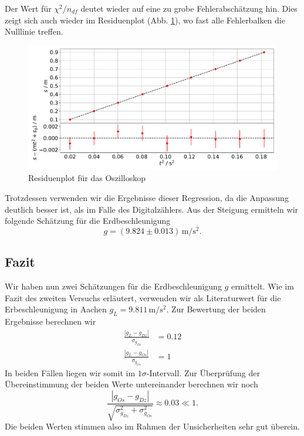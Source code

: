 \documentclass[a4paper, 12pt]{scrartcl}
\begin{document}
Der Wert für $\chi^2/n_{df}$ deutet wieder auf eine zu grobe Fehlerabschätzung hin. Dies zeigt sich auch wieder im Residuenplot (Abb. \ref{ResOz}), wo fast alle Fehlerbalken die Nulllinie treffen.
\begin{figure}[h!]
	\centering
	\includegraphics[width=\textwidth]{plots/regression_fF2.pdf}
	\caption{Residuenplot für das Oszilloskop}
	\label{ResOz}
\end{figure}
Trotzdessen verwenden wir die Ergebnisse dieser Regression, da die Anpassung deutlich besser ist, als im Falle des Digitalzählers. Aus der Steigung ermitteln wir folgende Schätzung für die Erdbeschleunigung
$$g = (9.824 \pm 0.013) \, \mathrm m / \mathrm s^2 .$$


\subsection{Fazit}

Wir haben nun zwei Schätzungen für die Erdbeschleunigung $g$ ermittelt. Wie im Fazit des zweiten Versuchs erläutert, verwenden wir als Literaturwert für die Erbeschleunigung in Aachen $g_L = 9.811 \, \mathrm m / \mathrm s^2$. 
Zur Bewertung der beiden Ergebnisse berechnen wir
\begin{align*}
\frac{|g_L-g_{Dz}|}{\sigma_{g_{Dz}}} &= 0.12 \\
\frac{|g_L-g_{Os}|}{\sigma_{g_{Os}}} &= 1
\end{align*}
In beiden Fällen liegen wir somit im $1\sigma$-Intervall. Zur Überprüfung der Übereinstimmung der beiden Werte untereinander berechnen wir noch
$$\frac{|g_{Os}-g_{Dz}|}{\sqrt{\sigma_{g_{Dz}}^2 + \sigma_{g_{Os}}^2}} \approx 0.03 \ll 1.$$
Die beiden Werten stimmen also im Rahmen der Unsicherheiten sehr gut überein. 


\newpage



\end{document}
